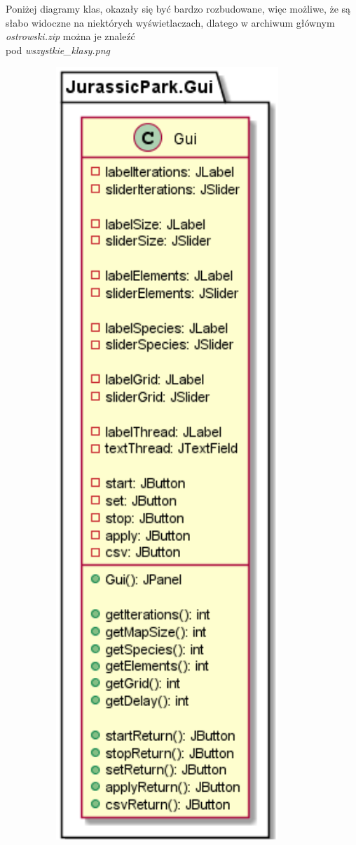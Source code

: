 Poniżej diagramy klas, okazały się być bardzo rozbudowane, więc możliwe, że są słabo widoczne na niektórych wyświetlaczach, dlatego w archiwum głównym \textit{ostrowski.zip} można je znaleźć \\ pod \textit{wszystkie\_klasy.png}
\newpage
\begin{figure}[h!]
    \centering
    \begin{minipage}{0.45\textwidth}
        \centering
        \includegraphics[width=0.9\textwidth]{images/class/gui.png} %

\end{minipage}
\end{figure}
